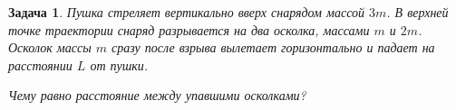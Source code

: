 \documentclass[a4paper, 11pt]{article}
\theoremstyle{break}
\newtheorem{problem}{Задача}[subsection]
\begin{document}
\begin{problem}
Пушка стреляет вертикально вверх снарядом массой $3m$.
В верхней точке траектории снаряд разрывается на два осколка, массами $m$ и $2m$.
Осколок массы $m$ сразу после взрыва вылетает горизонтально и падает на расстоянии
$L$ от пушки.

Чему равно расстояние между упавшими осколками?

\end{problem}
\end{document}
